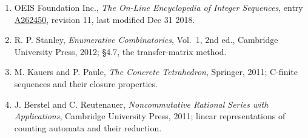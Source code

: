 \documentclass[11pt]{article}
\theoremstyle{definition}
\begin{document}
\begin{enumerate}

\item OEIS Foundation Inc., \emph{The On-Line Encyclopedia of Integer Sequences}, entry \href{https://oeis.org/A262450}{A262450}, revision 11, last modified Dec 31 2018.

\item R. P. Stanley, \emph{Enumerative Combinatorics}, Vol.~1, 2nd ed., Cambridge University Press, 2012; \S4.7, the transfer-matrix method.

\item M. Kauers and P. Paule, \emph{The Concrete Tetrahedron}, Springer, 2011; C-finite sequences and their closure properties.

\item J. Berstel and C. Reutenauer, \emph{Noncommutative Rational Series with Applications}, Cambridge University Press, 2011; linear representations of counting automata and their reduction.

\end{enumerate}
\end{document}
